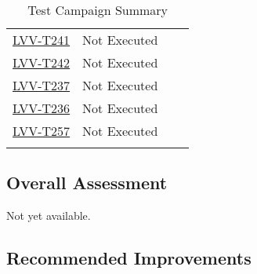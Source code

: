 \documentclass[SE,lsstdraft,STR,toc]{lsstdoc}
\begin{document}
\begin{longtable}{p{2cm}p{2.5cm}p{9cm}p{2.5cm}}
\begin{minipage}[]{9cm}
    \medskip
    \end{minipage}
    &
    \\\hline
    \href{https://jira.lsstcorp.org/secure/Tests.jspa#/testCase/LVV-T241}{LVV-T241}
    & Not Executed &
    \begin{minipage}[]{9cm}
    \smallskip
    
    \medskip
    \end{minipage}
    &
    \\\hline
    \href{https://jira.lsstcorp.org/secure/Tests.jspa#/testCase/LVV-T242}{LVV-T242}
    & Not Executed &
    \begin{minipage}[]{9cm}
    \smallskip
    
    \medskip
    \end{minipage}
    &
    \\\hline
    \href{https://jira.lsstcorp.org/secure/Tests.jspa#/testCase/LVV-T237}{LVV-T237}
    & Not Executed &
    \begin{minipage}[]{9cm}
    \smallskip
    
    \medskip
    \end{minipage}
    &
    \\\hline
    \href{https://jira.lsstcorp.org/secure/Tests.jspa#/testCase/LVV-T236}{LVV-T236}
    & Not Executed &
    \begin{minipage}[]{9cm}
    \smallskip
    
    \medskip
    \end{minipage}
    &
    \\\hline
    \href{https://jira.lsstcorp.org/secure/Tests.jspa#/testCase/LVV-T257}{LVV-T257}
    & Not Executed &
    \begin{minipage}[]{9cm}
    \smallskip
    
    \medskip
    \end{minipage}
    &
    \\\hline
\caption{Test Campaign Summary}
\label{table:summary}
\end{longtable}

\subsection{Overall Assessment}
\label{sect:overallassessment}

Not yet available.

\subsection{Recommended Improvements}
\label{sect:recommendations}
\end{document}

